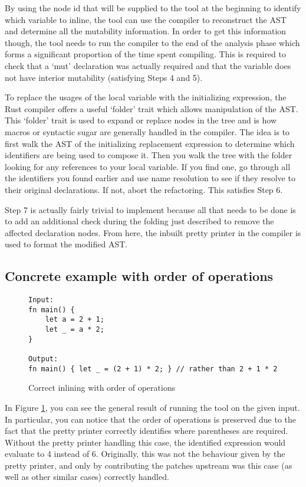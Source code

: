 By using the node id that will be supplied to the tool at the beginning to identify which variable to inline, the tool can use the compiler to reconstruct the AST and determine all the mutability information. In order to get this information though, the tool needs to run the compiler to the end of the analysis phase which forms a significant proportion of the time spent compiling. This is required to check that a `mut' declaration was actually required and that the variable does not have interior mutability (satisfying Steps 4 and 5).

To replace the usages of the local variable with the initializing expression, the Rust compiler offers a useful `folder' trait which allows manipulation of the AST. This `folder' trait is used to expand or replace nodes in the tree and is how macros or syntactic sugar are generally handled in the compiler. The idea is to first walk the AST of the initializing replacement expression to determine which identifiers are being used to compose it. Then you walk the tree with the folder looking for any references to your local variable. If you find one, go through all the identifiers you found earlier and use name resolution to see if they resolve to their original declarations. If not, abort the refactoring. This satisfies Step 6.

Step 7 is actually fairly trivial to implement because all that needs to be done is to add an additional check during the folding just described to remove the affected declaration nodes. From here, the inbuilt pretty printer in the compiler is used to format the modified AST.

\subsection{Concrete example with order of operations}

\begin{figure}[H]
\centering
\begin{verbatim}
Input:
fn main() {
    let a = 2 + 1;
    let _ = a * 2;
}

Output:
fn main() { let _ = (2 + 1) * 2; } // rather than 2 + 1 * 2
\end{verbatim}
\caption{Correct inlining with order of operations}
\label{Fig:exinline}
\end{figure}

In Figure \ref{Fig:exinline}, you can see the general result of running the tool on the given input. In particular, you can notice that the order of operations is preserved due to the fact that the pretty printer correctly identifies where parentheses are required. Without the pretty printer handling this case, the identified expression would evaluate to 4 instead of 6. Originally, this was not the behaviour given by the pretty printer, and only by contributing the patches upstream was this case (as well as other similar cases) correctly handled.


